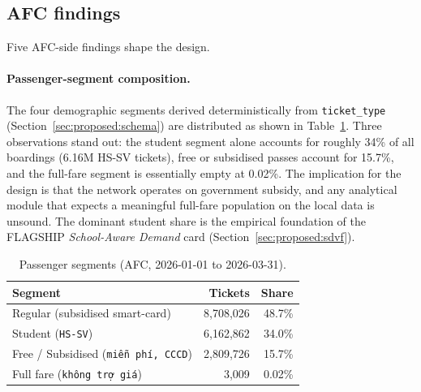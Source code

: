 \subsection{AFC findings}

Five AFC-side findings shape the design.

\paragraph{Passenger-segment composition.}
The four demographic segments derived deterministically from
\texttt{ticket\_type} (Section~\ref{sec:proposed:schema}) are
distributed as shown in Table~\ref{tab:proposed:segments}. Three
observations stand out: the student segment alone accounts for
roughly 34\% of all boardings (6.16M HS-SV tickets), free or
subsidised passes account for 15.7\%, and the full-fare segment is
essentially empty at 0.02\%. The implication for the design is that
the network operates on government subsidy, and any analytical
module that expects a meaningful full-fare population on the
local data is unsound. The dominant student share is the empirical
foundation of the FLAGSHIP \emph{School-Aware Demand} card
(Section~\ref{sec:proposed:sdvf}).

\begin{table}[H]
\centering
\caption{Passenger segments (AFC, 2026-01-01 to 2026-03-31).}
\label{tab:proposed:segments}
\begin{tabularx}{\linewidth}{Xrr}
\hline
Segment & Tickets & Share \\
\hline
Regular (subsidised smart-card)              & 8{,}708{,}026 & 48.7\% \\
Student (\texttt{HS-SV})                     & 6{,}162{,}862 & 34.0\% \\
Free / Subsidised (\texttt{miễn phí, CCCD})  & 2{,}809{,}726 & 15.7\% \\
Full fare (\texttt{không trợ giá})           &      3{,}009 & 0.02\% \\
\hline
\end{tabularx}
\end{table}


